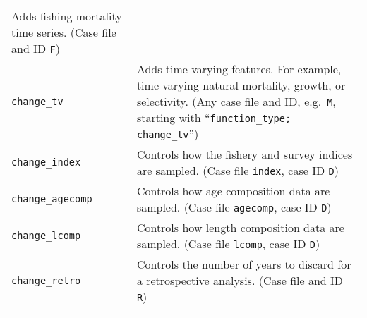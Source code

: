 \documentclass[11pt]{article}
\begin{document}
\begin{longtable}[c]{@{}ll@{}}
\begin{minipage}[t]{0.57\columnwidth}
Adds fishing mortality time series. (Case file and ID \texttt{F})
\end{minipage}
\\\noalign{\medskip}
\begin{minipage}[t]{0.32\columnwidth}\raggedright
\texttt{change\_tv}
\end{minipage} & \begin{minipage}[t]{0.57\columnwidth}\raggedright
Adds time-varying features. For example, time-varying natural mortality, growth, or selectivity. (Any case file and ID, e.g.~\texttt{M}, starting with ``\texttt{function\_type; change\_tv}'')
\end{minipage}
\\\noalign{\medskip}
\begin{minipage}[t]{0.32\columnwidth}\raggedright
\texttt{change\_index}
\end{minipage} & \begin{minipage}[t]{0.57\columnwidth}\raggedright
Controls how the fishery and survey indices are sampled. (Case file \texttt{index}, case ID \texttt{D})
\end{minipage}
\\\noalign{\medskip}
\begin{minipage}[t]{0.32\columnwidth}\raggedright
\texttt{change\_agecomp}
\end{minipage} & \begin{minipage}[t]{0.57\columnwidth}\raggedright
Controls how age composition data are sampled. (Case file \texttt{agecomp}, case ID \texttt{D})
\end{minipage}
\\\noalign{\medskip}
\begin{minipage}[t]{0.32\columnwidth}\raggedright
\texttt{change\_lcomp}
\end{minipage} & \begin{minipage}[t]{0.57\columnwidth}\raggedright
Controls how length composition data are sampled. (Case file \texttt{lcomp}, case ID \texttt{D})
\end{minipage}
\\\noalign{\medskip}
\begin{minipage}[t]{0.32\columnwidth}\raggedright
\texttt{change\_retro}
\end{minipage} & \begin{minipage}[t]{0.57\columnwidth}\raggedright
Controls the number of years to discard for a retrospective analysis. (Case file and ID \texttt{R})
\end{minipage}
\\\noalign{\medskip}

\end{longtable}
\end{document}
